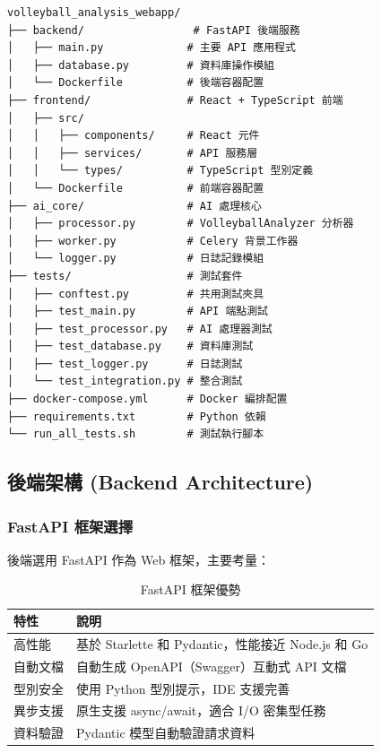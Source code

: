 \documentclass[a4paper,14pt,oneside]{article}
\begin{document}
\begin{lstlisting}[basicstyle=\ttfamily\footnotesize, frame=single, caption={專案目錄結構}]
volleyball_analysis_webapp/
├── backend/                 # FastAPI 後端服務
│   ├── main.py             # 主要 API 應用程式
│   ├── database.py         # 資料庫操作模組
│   └── Dockerfile          # 後端容器配置
├── frontend/               # React + TypeScript 前端
│   ├── src/
│   │   ├── components/     # React 元件
│   │   ├── services/       # API 服務層
│   │   └── types/          # TypeScript 型別定義
│   └── Dockerfile          # 前端容器配置
├── ai_core/                # AI 處理核心
│   ├── processor.py        # VolleyballAnalyzer 分析器
│   ├── worker.py           # Celery 背景工作器
│   └── logger.py           # 日誌記錄模組
├── tests/                  # 測試套件
│   ├── conftest.py         # 共用測試夾具
│   ├── test_main.py        # API 端點測試
│   ├── test_processor.py   # AI 處理器測試
│   ├── test_database.py    # 資料庫測試
│   ├── test_logger.py      # 日誌測試
│   └── test_integration.py # 整合測試
├── docker-compose.yml      # Docker 編排配置
├── requirements.txt        # Python 依賴
└── run_all_tests.sh        # 測試執行腳本
\end{lstlisting}

\subsection{後端架構 (Backend Architecture)}

\subsubsection{FastAPI 框架選擇}

後端選用 FastAPI 作為 Web 框架，主要考量：

\begin{table}[H]
    \centering
    \caption{FastAPI 框架優勢}
    \begin{tabular}{|l|p{8cm}|}
        \hline
        \textbf{特性} & \textbf{說明} \\
        \hline
        高性能 & 基於 Starlette 和 Pydantic，性能接近 Node.js 和 Go \\
        \hline
        自動文檔 & 自動生成 OpenAPI（Swagger）互動式 API 文檔 \\
        \hline
        型別安全 & 使用 Python 型別提示，IDE 支援完善 \\
        \hline
        異步支援 & 原生支援 async/await，適合 I/O 密集型任務 \\
        \hline
        資料驗證 & Pydantic 模型自動驗證請求資料 \\
        \hline
    \end{tabular}
\end{table}
\end{document}
